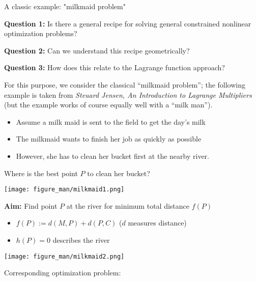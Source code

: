 \documentclass[11pt,compress,t,notes=noshow, xcolor=table]{beamer}
\begin{document}
\begin{vbframe}{A classic example: "milkmaid problem"}

\textbf{Question 1:} Is there a general recipe for solving general constrained nonlinear optimization problems? 

\textbf{Question 2:} Can we understand this recipe geometrically?

\textbf{Question 3:} How does this relate to the Lagrange function approach?

\lz
For this purpose, we consider the classical \enquote{milkmaid problem}; the following example is taken
from \textit{Steuard Jensen, An Introduction to Lagrange Multipliers} (but the example works
of course equally well with a \enquote{milk man}). 

\begin{itemize}
	\item Assume a milk maid is sent to the field to get the day's milk
	\item The milkmaid wants to finish her job as quickly as possible
	\item However, she has to clean her bucket first at the nearby river. 
\end{itemize}

\framebreak 
Where is the best point $P$ to clean her bucket?

\medskip

\begin{center}
	\texttt{[image: figure\_man/milkmaid1.png]}
\end{center}

\framebreak 

\textbf{Aim:} Find point $P$ at the river for minimum total distance $f(P)$

\medskip

\begin{itemize} 
    \item $f(P) := d(M, P) + d(P, C)$ ($d$ measures distance)
    \item $h(P) = 0$ describes the river
\end{itemize}

\medskip

\begin{center}
	\texttt{[image: figure\_man/milkmaid2.png]}
\end{center}


\framebreak 

Corresponding optimization problem:


\end{vbframe}
\end{document}
